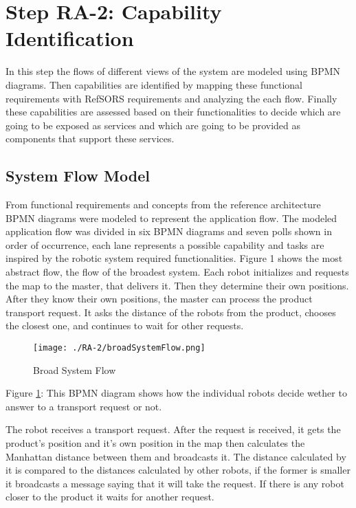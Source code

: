 \section{Step RA-2: Capability Identification}
In this step the flows of different views of the system are modeled using BPMN diagrams. Then capabilities are identified by mapping these functional requirements with RefSORS requirements and analyzing the each flow. Finally these capabilities are assessed based on their functionalities to decide which are going to be exposed as services and which are going to be provided as components that support these services.

\subsection{System Flow Model}
From functional requirements and concepts from the reference architecture BPMN diagrams were modeled to represent the application flow. The modeled application flow was divided in six BPMN diagrams and seven polls shown in order of occurrence, each lane represents a possible capability and tasks are inspired by the robotic system required functionalities.
Figure 1 shows the most abstract flow, the flow of the broadest system. Each robot initializes and requests the map to the master, that delivers it. Then they determine their own positions. After they know their own positions, the master can process the product transport request. It asks the distance of the robots from the product, chooses the closest one, and continues to wait for other requests.

\begin{figure}[ht!]
 \centering
 \texttt{[image: ./RA-2/broadSystemFlow.png]}
 \caption{Broad System Flow}
 \label{fig:broadsystemflow}
\end{figure}

Figure \ref{fig:broadsystemflow}: This BPMN diagram shows how the individual robots decide wether to answer to a transport request or not.

The robot receives a transport request. After the request is received, it gets the product's position and it's own position in the map then calculates the Manhattan distance between them and broadcasts it. The distance calculated by it is compared to the distances calculated by other robots, if the former is smaller it broadcasts a message saying that it will take the request. If there is any robot closer to the product it waits for another request.

